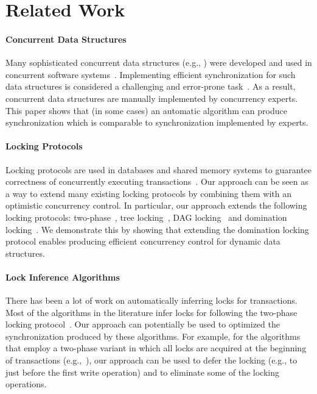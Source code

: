 \section{Related Work}\label{sec:related}
\paragraph{Concurrent Data Structures}
Many sophisticated concurrent data structures (e.g., \cite{ArbelA2014,DrachslerVY2014,NatarajanM2014,BrownER2014,CrainGR2013,BraginskyP2012,
AfekKKMT2012,EllenFRB2010,BronsonCCO2010,HerlihyLLS2007,Michael:1996})
were developed and used in concurrent software systems~\cite{Ohad:OOPSLA11}.
Implementing efficient synchronization for such data structures is considered a challenging and error-prone task~\cite{Ohad:OOPSLA11,Doh:SPAA04,Jin:2012}.
As a result, concurrent data structures are manually implemented by concurrency experts.
This paper shows that (in some cases) an automatic algorithm can produce synchronization which is comparable to synchronization implemented by experts.

\paragraph{Locking Protocols}
Locking protocols are used in databases and shared memory systems to guarantee correctness
of concurrently executing transactions~\cite{Weikum:2001,BHG:Book87}.
Our approach can be seen as a way to extend many existing locking protocols by combining them with an optimistic concurrency control.
In particular, our approach extends the following locking protocols:
two-phase~\cite{Eswaran:1976}, tree locking~\cite{SilberschatzK1980}, DAG locking~\cite{CH:PODS95} and domination locking~\cite{Gueta2011}.
We demonstrate this by showing that extending the  domination locking protocol enables producing efficient concurrency control for
dynamic data structures.


\paragraph{Lock Inference Algorithms}
There has been a lot of work on automatically inferring locks for transactions.
Most of the algorithms in the literature infer locks for following the two-phase
locking protocol~\cite{MZGB:POPL06,Emmi06POPL,gudka2012lock,CCG:PLDI08,HFP:TRANSACT06,CGE:CC08}.
Our approach can potentially be used to optimized the synchronization produced by these algorithms.
For example, for the algorithms that employ a two-phase variant in which all locks are acquired at the beginning of transactions (e.g.,~\cite{gudka2012lock,CCG:PLDI08}),
our approach can be used to defer the locking (e.g., to just before the first write operation) and to eliminate some of the locking operations.


